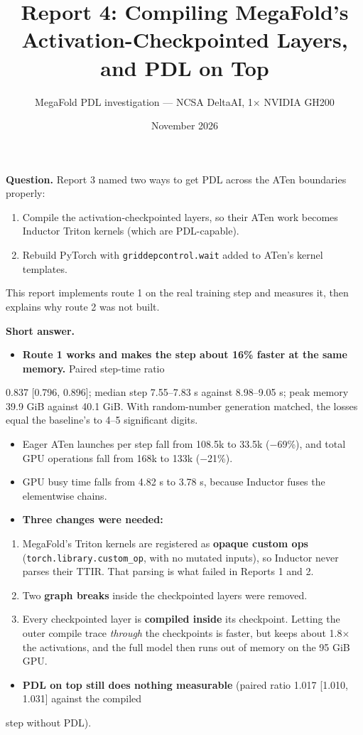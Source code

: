 \documentclass[10pt]{article}
\title{Report 4: Compiling MegaFold's Activation-Checkpointed Layers, and PDL on Top}
\author{MegaFold PDL investigation --- NCSA DeltaAI, 1$\times$ NVIDIA GH200}
\date{November 2026}
\begin{document}
\maketitle

\textbf{Question.} Report 3 named two ways to get PDL across the ATen boundaries properly:


\begin{enumerate}
\item Compile the activation-checkpointed layers, so their ATen work becomes Inductor Triton kernels (which are PDL-capable).
\item Rebuild PyTorch with \texttt{griddepcontrol.wait} added to ATen's kernel templates.
\end{enumerate}

This report implements route 1 on the real training step and measures it, then explains why route 2 was not built.


\textbf{Short answer.}


\begin{itemize}
\item \textbf{Route 1 works and makes the step about 16\% faster at the same memory.} Paired step-time ratio
\end{itemize}
0.837 [0.796, 0.896]; median step 7.55--7.83 s against 8.98--9.05 s; peak memory 39.9 GiB against 40.1 GiB. With random-number generation matched, the losses equal the baseline's to 4--5 significant digits.

\begin{itemize}
\item Eager ATen launches per step fall from 108.5k to 33.5k ($-$69\%), and total GPU operations fall from 168k to 133k ($-$21\%).
\item GPU busy time falls from 4.82 s to 3.78 s, because Inductor fuses the elementwise chains.
\item \textbf{Three changes were needed:}
\end{itemize}
\begin{enumerate}
\item MegaFold's Triton kernels are registered as \textbf{opaque custom ops} (\texttt{torch.library.custom\_op}, with no mutated inputs), so Inductor never parses their TTIR. That parsing is what failed in Reports 1 and 2.
\item Two \textbf{graph breaks} inside the checkpointed layers were removed.
\item Every checkpointed layer is \textbf{compiled inside} its checkpoint. Letting the outer compile trace \emph{through} the checkpoints is faster, but keeps about 1.8$\times$ the activations, and the full model then runs out of memory on the 95 GiB GPU.
\end{enumerate}
\begin{itemize}
\item \textbf{PDL on top still does nothing measurable} (paired ratio 1.017 [1.010, 1.031] against the compiled
\end{itemize}
step without PDL).
\end{document}
